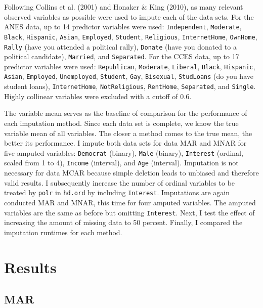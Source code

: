 \documentclass[12pt,econ]{sources/authesis}
\begin{document}
Following Collins et al. (2001) and Honaker \& King (2010), as many relevant observed variables as possible were used to impute each of the data sets. For the ANES data, up to 14 predictor variables were used: \texttt{Independent}, \texttt{Moderate}, \texttt{Black}, \texttt{Hispanic}, \texttt{Asian}, \texttt{Employed}, \texttt{Student}, \texttt{Religious}, \texttt{InternetHome}, \texttt{OwnHome}, \texttt{Rally} (have you attended a political rally), \texttt{Donate} (have you donated to a political candidate), \texttt{Married}, and \texttt{Separated}. For the CCES data, up to 17 predictor variables were used: \texttt{Republican}, \texttt{Moderate}, \texttt{Liberal}, \texttt{Black}, \texttt{Hispanic}, \texttt{Asian}, \texttt{Employed}, \texttt{Unemployed}, \texttt{Student}, \texttt{Gay}, \texttt{Bisexual}, \texttt{StudLoans} (do you have student loans), \texttt{InternetHome}, \texttt{NotReligious}, \texttt{RentHome}, \texttt{Separated}, and \texttt{Single}. Highly collinear variables were excluded with a cutoff of 0.6.

The variable mean serves as the baseline of comparison for the performance of each imputation method. Since each data set is complete, we know the true variable mean of all variables. The closer a method comes to the true mean, the better its performance. I impute both data sets for data MAR and MNAR for five amputed variables: \texttt{Democrat} (binary), \texttt{Male} (binary), \texttt{Interest} (ordinal, scaled from 1 to 4), \texttt{Income} (interval), and \texttt{Age} (interval). Imputation is not necessary for data MCAR because simple deletion leads to unbiased and therefore valid results. I subsequently increase the number of ordinal variables to be treated by \texttt{polr} in \texttt{hd.ord} by including \texttt{Interest}. Imputations are again conducted MAR and MNAR, this time for four amputed variables. The amputed variables are the same as before but omitting \texttt{Interest}. Next, I test the effect of increasing the amount of missing data to 50 percent. Finally, I compared the imputation runtimes for each method.

\hypertarget{ordmiss-results}{%
\section{Results}\label{ordmiss-results}}

\hypertarget{ordmiss-results-mar}{%
\subsection{MAR}\label{ordmiss-results-mar}}
\end{document}
